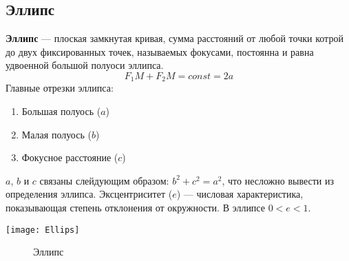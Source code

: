 \documentclass[10pt,a5paper]{article}
\begin{document}
\subsection*{Эллипс}
\textbf{Эллипс} --- плоская замкнутая кривая, сумма расстояний от любой точки котрой до двух фиксированных точек, называемых фокусами, постоянна и равна удвоенной большой полуоси эллипса.
$$F_1M+F_2M=const=2a$$
Главные отрезки эллипса:
\begin{enumerate}
\item Большая полуось ($a$)
\item Малая полуось ($b$)
\item Фокусное расстояние ($c$)
\end{enumerate}
$a$, $b$ и $c$ связаны слейдующим образом: $b^2+c^2=a^2$, что несложно вывести из определения эллипса.
 Эксцентриситет ($e$) --- числовая характеристика, показывающая степень отклонения от окружности. В эллипсе $0<e<1$.
 \begin{center}
\texttt{[image: Ellips]}
\begin{figure}[h!]
\caption{Эллипс}
\end{figure}
\end{center}
\end{document}
